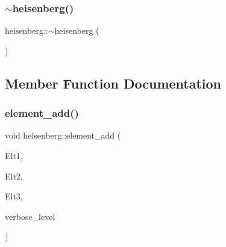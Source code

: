 \mbox{\label{classheisenberg_a48ed5a56e78ec40c8d7305a245efbabb}} 
\subsubsection{\texorpdfstring{$\sim$heisenberg()}{~heisenberg()}}
{\footnotesize\ttfamily heisenberg\+::$\sim$heisenberg (\begin{DoxyParamCaption}{ }\end{DoxyParamCaption})}



\subsection{Member Function Documentation}
\mbox{\label{classheisenberg_afca08c599ec9225baedede3b0233bdec}} 
\subsubsection{\texorpdfstring{element\+\_\+add()}{element\_add()}}
{\footnotesize\ttfamily void heisenberg\+::element\+\_\+add (\begin{DoxyParamCaption}\item[{\mbox{\hyperlink{galois_8h_a09fddde158a3a20bd2dcadb609de11dc}{I\+NT}} $\ast$}]{Elt1,  }\item[{\mbox{\hyperlink{galois_8h_a09fddde158a3a20bd2dcadb609de11dc}{I\+NT}} $\ast$}]{Elt2,  }\item[{\mbox{\hyperlink{galois_8h_a09fddde158a3a20bd2dcadb609de11dc}{I\+NT}} $\ast$}]{Elt3,  }\item[{\mbox{\hyperlink{galois_8h_a09fddde158a3a20bd2dcadb609de11dc}{I\+NT}}}]{verbose\+\_\+level }\end{DoxyParamCaption})}

\mbox{\label{classheisenberg_a204fb1674976610c2853e645fb42fe63}} 
